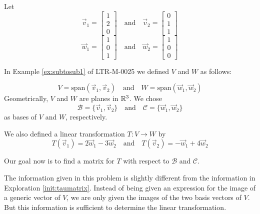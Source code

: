 \documentclass{ximera}
\begin{document}
\begin{exploration}\label{init:matlintransgeneral}
Let
$$\vec{v}_1=\begin{bmatrix}1\\2\\0\end{bmatrix}\quad\text{and}\quad\vec{v}_2=\begin{bmatrix}0\\1\\1\end{bmatrix}$$
$$\vec{w}_1=\begin{bmatrix}1\\0\\1\end{bmatrix}\quad\text{and}\quad\vec{w}_2=\begin{bmatrix}1\\0\\0\end{bmatrix}$$

In Example \ref{ex:subtosub1} of LTR-M-0025 we defined $V$ and $W$ as follows:

$$V=\text{span}(\vec{v}_1, \vec{v}_2)\quad\text{and}\quad W=\text{span}(\vec{w}_1, \vec{w}_2)$$
Geometrically, $V$ and $W$ are planes in $\mathbb{R}^3$.
We chose
$$\mathcal{B}=\{\vec{v}_1, \vec{v}_2\}\quad\text{and}\quad\mathcal{C}=\{\vec{w}_1, \vec{w}_2\}$$
as bases of $V$ and $W$, respectively.

We also defined a linear transformation $T:V\rightarrow W$ by 
$$T(\vec{v}_1)=2\vec{w}_1-3\vec{w}_2\quad\text{and} \quad T(\vec{v}_2)=-\vec{w}_1+4\vec{w}_2$$

Our goal now is to find a matrix for $T$ with respect to $\mathcal{B}$ and $\mathcal{C}$.  

The information given in this problem is slightly different from the information in Exploration \ref{init:taumatrix}.  Instead of being given an expression for the image of a generic vector of $V$, we are only given the images of the two basis vectors of $V$.  But this information is sufficient to determine the linear transformation.


\end{exploration}
\end{document}

